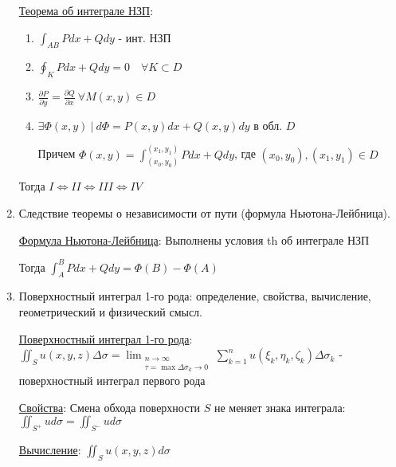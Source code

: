 \documentclass[12pt]{article}
\begin{document}
\begin{enumerate}
        \hyperlink{theorempathindependentintegrals}{Теорема об интеграле НЗП}:

        \begin{enumerate}[label=\Roman*.]

        \item $\int_{AB} Pdx + Qdy$ - инт. НЗП

        \item $\oint_K Pdx + Qdy = 0 \quad \forall K \subset D$

        \item $\frac{\partial P}{\partial y} = \frac{\partial Q}{\partial x} \ \forall M(x, y) \in D$

        \item $\exists \Phi(x, y) \ | \ d\Phi = P(x, y)dx + Q(x, y)dy$ в обл. $D$

        Причем $\Phi(x, y) = \int_{(x_0,y_0)}^{(x_1,y_1)}Pdx+Qdy$, где $(x_0, y_0), (x_1,y_1) \in D$

        \end{enumerate}

        Тогда $I \Longleftrightarrow II \Longleftrightarrow III \Longleftrightarrow IV$

        \item Следствие теоремы о независимости от пути (формула Ньютона-Лейбница).

        \hyperlink{theoremNewtonLeibnizforpathindependantintegral}{Формула Ньютона-Лейбница}:
        Выполнены условия th об интеграле НЗП

        Тогда $\int_A^B Pdx + Qdy = \Phi(B) - \Phi(A)$

        \item Поверхностный интеграл 1-го рода: определение, свойства, вычисление, геометрический и физический смысл.

        \hyperlink{surfaceintegraloffirstkind}{Поверхностный интеграл 1-го рода}:
        $\iint_S u(x, y, z) \Delta \sigma = \lim_{\substack{n \to \infty \\ \tau = \max \Delta \sigma_k \to 0}} \sum_{k = 1}^{n} u(\xi_k, \eta_k, \zeta_k) \Delta \sigma_k$ - поверхностный интеграл первого рода

        \hyperlink{surfaceintegraloffirstkindproperties}{Свойства}: Смена обхода поверхности $S$ не меняет знака интеграла: $\iint_{S^+} u d\sigma = \iint_{S^-} u d\sigma$

        \hyperlink{surfaceintegraloffirstkindcalculation}{Вычисление}: $\iint_S u(x, y, z) d\sigma$


\end{enumerate}
\end{document}
